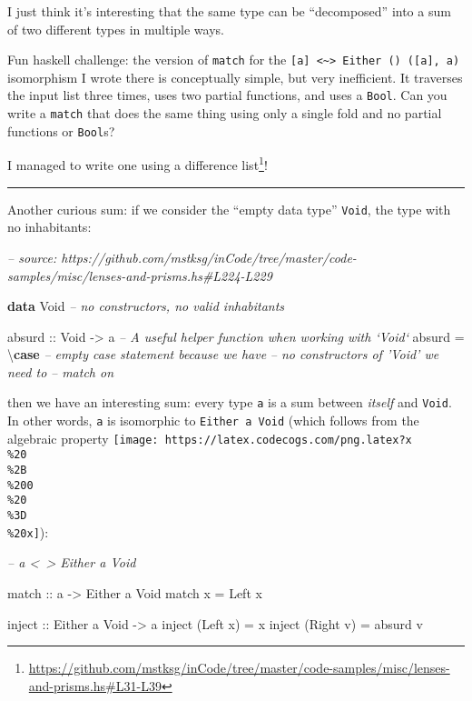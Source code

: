 \documentclass[]{article}
\newenvironment{Shaded}{}{}
\newcommand{\CommentTok}[1]{\textcolor[rgb]{0.38,0.63,0.69}{\textit{#1}}}
\newcommand{\DataTypeTok}[1]{\textcolor[rgb]{0.56,0.13,0.00}{#1}}
\newcommand{\FunctionTok}[1]{\textcolor[rgb]{0.02,0.16,0.49}{#1}}
\newcommand{\KeywordTok}[1]{\textcolor[rgb]{0.00,0.44,0.13}{\textbf{#1}}}
\newcommand{\NormalTok}[1]{#1}
\newcommand{\OtherTok}[1]{\textcolor[rgb]{0.00,0.44,0.13}{#1}}
\renewcommand{\href}[2]{#2\footnote{\url{#1}}}
\begin{document}
I just think it's interesting that the same type can be ``decomposed'' into a
sum of two different types in multiple ways.

Fun haskell challenge: the version of \texttt{match} for the
\texttt{{[}a{]}\ \textless{}\textasciitilde{}\textgreater{}\ Either\ ()\ ({[}a{]},\ a)}
isomorphism I wrote there is conceptually simple, but very inefficient. It
traverses the input list three times, uses two partial functions, and uses a
\texttt{Bool}. Can you write a \texttt{match} that does the same thing using
only a single fold and no partial functions or \texttt{Bool}s?

I managed to write one
\href{https://github.com/mstksg/inCode/tree/master/code-samples/misc/lenses-and-prisms.hs\#L31-L39}{using
a difference list}!

\begin{center}\rule{0.5\linewidth}{\linethickness}\end{center}

Another curious sum: if we consider the ``empty data type'' \texttt{Void}, the
type with no inhabitants:

\begin{Shaded}
\begin{Highlighting}[]
\CommentTok{-- source: https://github.com/mstksg/inCode/tree/master/code-samples/misc/lenses-and-prisms.hs#L224-L229}

\KeywordTok{data} \DataTypeTok{Void}           \CommentTok{-- no constructors, no valid inhabitants}

\OtherTok{absurd ::} \DataTypeTok{Void} \OtherTok{->}\NormalTok{ a     }\CommentTok{-- A useful helper function when working with `Void`}
\NormalTok{absurd }\FunctionTok{=}\NormalTok{ \textbackslash{}}\KeywordTok{case} \CommentTok{-- empty case statement because we have}
               \CommentTok{-- no constructors of 'Void' we need to}
               \CommentTok{-- match on}
\end{Highlighting}
\end{Shaded}

then we have an interesting sum: every type \texttt{a} is a sum between
\emph{itself} and \texttt{Void}. In other words, \texttt{a} is isomorphic to
\texttt{Either\ a\ Void} (which follows from the algebraic property
\texttt{[image: https://latex.codecogs.com/png.latex?x\\\%20\\\%2B\\\%200\\\%20\\\%3D\\\%20x]}):

\begin{Shaded}
\begin{Highlighting}[]
\CommentTok{-- a <~> Either a Void}

\OtherTok{match ::}\NormalTok{ a }\OtherTok{->} \DataTypeTok{Either}\NormalTok{ a }\DataTypeTok{Void}
\NormalTok{match x }\FunctionTok{=} \DataTypeTok{Left}\NormalTok{ x}

\OtherTok{inject ::} \DataTypeTok{Either}\NormalTok{ a }\DataTypeTok{Void} \OtherTok{->}\NormalTok{ a}
\NormalTok{inject (}\DataTypeTok{Left}\NormalTok{  x) }\FunctionTok{=}\NormalTok{ x}
\NormalTok{inject (}\DataTypeTok{Right}\NormalTok{ v) }\FunctionTok{=}\NormalTok{ absurd v}
\end{Highlighting}
\end{Shaded}
\end{document}
